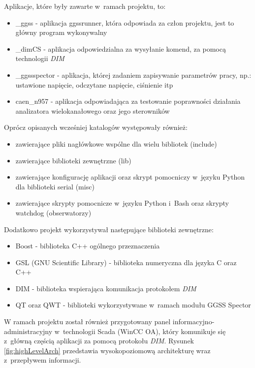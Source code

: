 \par Aplikacje, które były zawarte w~ramach projektu, to:
\begin{itemize}
\item \_ggss - aplikacja ggssrunner, która odpowiada za człon projektu, jest to główny program wykonywalny
\item \_dimCS - aplikacja odpowiedzialna za wysyłanie komend, za pomocą technologii \textit{DIM}
\item \_ggssspector - aplikacja, której zadaniem zapisywanie parametrów pracy, np.: ustawione napięcie, odczytane napięcie, ciśnienie itp
\item caen\_n957 - aplikacja odpowiadająca za testowanie poprawności działania analizatora wielokanałowego oraz jego sterowników
\end{itemize}

\par Oprócz opisanych wcześniej katalogów występowały również:
\begin{itemize}
\item zawierające pliki nagłówkowe wspólne dla wielu bibliotek (include)
\item zawierające biblioteki zewnętrzne (lib)
\item zawierające konfigurację aplikacji oraz skrypt pomocniczy w~języku Python dla biblioteki serial (misc)
\item zawierające skrypty pomocnicze w~języku Python i~Bash oraz skrypty watchdog (obserwatorzy)
\end{itemize}

\par Dodatkowo projekt wykorzystywał następujące biblioteki zewnętrzne:
\begin{itemize}
\item Boost - biblioteka C++ ogólnego przeznaczenia
\item GSL (GNU Scientific Library) - biblioteka numeryczna dla języka C oraz C++
\item DIM - biblioteka wspierająca komunikacja protokołem \textit{DIM}
\item QT oraz QWT - biblioteki wykorzystywane w~ramach modułu GGSS Spector
\end{itemize}
W ramach projektu został również przygotowany panel informacyjno-administracyjny w~technologii Scada (WinCC OA), który komunikuje się z~główną częścią aplikacji za pomocą protokołu \textit{DIM}. Rysunek \ref{fig:highLevelArch} przedstawia wysokopoziomową architekturę wraz z~przepływem informacji.

